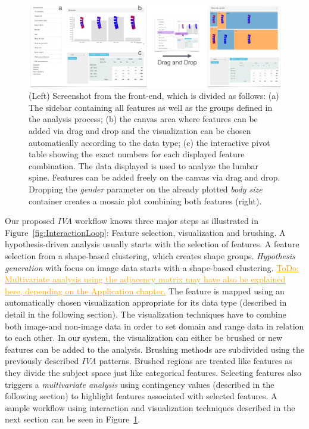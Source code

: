 \documentclass[journal]{style/vgtc} 			          %
\newcommand{\com}[1]{\textcolor{orange}{\uline{#1}}}
\begin{document}
\begin{figure}[htb]
 \centering
 \includegraphics[width=1\textwidth, resolution=300]{figures/visualization}
 \caption{(Left) Screenshot from the front-end, which is divided as follows: (a) The sidebar containing all features as well as the groups defined in the analysis process; (b) the canvas area where features can be added via drag and drop and the visualization can be chosen automatically according to the data type; (c) the interactive pivot table showing the exact numbers for each displayed feature combination. The data displayed is used to analyze the lumbar spine. Features can be added freely on the canvas via drag and drop. Dropping the \emph{gender} parameter on the already plotted \emph{body size} container creates a mosaic plot combining both features (right).
 }
 \label{fig:visualization}
\end{figure}
Our proposed \emph{IVA} workflow knows three major steps as illustrated in Figure~\ref{fig:InteractionLoop}: Feature selection, visualization and brushing.
%
A hypothesis-driven analysis usually starts with the selection of features.
%
A feature selection from a shape-based clustering, which creates shape groups.
%
\emph{Hypothesis generation} with focus on image data starts with a shape-based clustering.
%
\com{ToDo: Multivariate analysis using the adjacency matrix may have also be explained here, depending on the Application chapter.}
%
The feature is mapped using an automatically chosen visualization appropriate for its data type (described in detail in the following section).
%
The visualization techniques have to combine both image-and non-image data in order to set domain and range data in relation to each other.
%
In our system, the visualization can either be brushed or new features can be added to the analysis. 
%
Brushing methods are subdivided using the previously described \emph{IVA} patterns.
%
Brushed regions are treated like features as they divide the subject space just like categorical features.
%
Selecting features also triggers a \emph{multivariate analysis} using contingency values (described in the following section) to highlight features associated with selected features.
%
A sample workflow using interaction and visualization techniques described in the next section can be seen in Figure~\ref{fig:visualization}.
\end{document}
